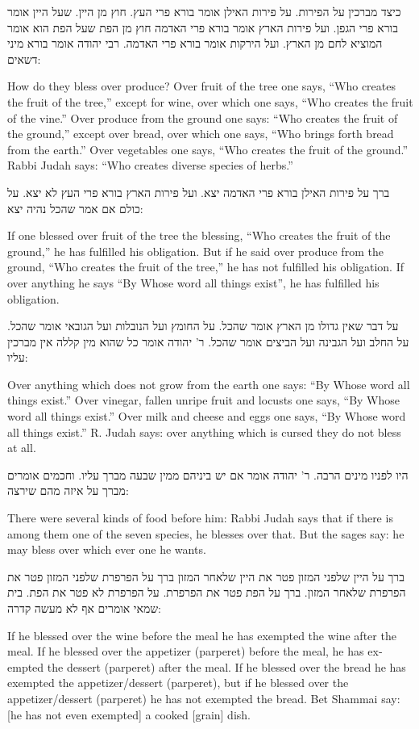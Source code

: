 \documentclass[12pt, openany]{book}
\newcommand{\textblock}[2]{
	{\fontsize{16pt}{20pt}\selectfont #1\\}
	
	\begin{english}
		#2
	\end{english}
	\clearpage
}
\begin{document}
\textblock{כיצד מברכין על הפירות. על פירות האילן אומר בורא פרי העץ. חוץ מן היין. שעל היין אומר בורא פרי הגפן. ועל פירות הארץ אומר בורא פרי האדמה חוץ מן הפת שעל הפת הוא אומר המוציא לחם מן הארץ. ועל הירקות אומר בורא פרי האדמה. רבי יהודה אומר בורא מיני דשאים: }{How do they bless over produce? Over fruit of the tree one says, “Who creates the fruit of the tree,” except for wine, over which one says, “Who creates the fruit of the vine.” Over produce from the ground one says: “Who creates the fruit of the ground,” except over bread, over which one says, “Who brings forth bread from the earth.” Over vegetables one says, “Who creates the fruit of the ground.” Rabbi Judah says: “Who creates diverse species of herbs.”}
\textblock{ברך על פירות האילן בורא פרי האדמה יצא. ועל פירות הארץ בורא פרי העץ לא יצא. על כולם אם אמר שהכל נהיה יצא: }{If one blessed over fruit of the tree the blessing, “Who creates the fruit of the ground,” he has fulfilled his obligation. But if he said over produce from the ground, “Who creates the fruit of the tree,” he has not fulfilled his obligation. If over anything he says “By Whose word all things exist”, he has fulfilled his obligation.}
\textblock{על דבר שאין גדולו מן הארץ אומר שהכל. על החומץ ועל הנובלות ועל הגובאי אומר שהכל. על החלב ועל הגבינה ועל הביצים אומר שהכל. ר' יהודה אומר כל שהוא מין קללה אין מברכין עליו: }{Over anything which does not grow from the earth one says: “By Whose word all things exist.” Over vinegar, fallen unripe fruit and locusts one says, “By Whose word all things exist.” Over milk and cheese and eggs one says, “By Whose word all things exist.”  R. Judah says: over anything which is cursed they do not bless at all.}
\textblock{היו לפניו מינים הרבה. ר' יהודה אומר אם יש ביניהם ממין שבעה מברך עליו. וחכמים אומרים מברך על איזה מהם שירצה: }{There were several kinds of food before him: Rabbi Judah says that if there is among them one of the seven species, he blesses over that. But the sages say: he may bless over which ever one he wants.}
\textblock{ברך על היין שלפני המזון פטר את היין שלאחר המזון ברך על הפרפרת שלפני המזון פטר את הפרפרת שלאחר המזון. ברך על הפת פטר את הפרפרת. על הפרפרת לא פטר את הפת. בית שמאי אומרים אף לא מעשה קדרה: }{If he blessed over the wine before the meal he has exempted the wine after the meal. If he blessed over the appetizer (parperet) before the meal, he has exempted the dessert (parperet) after the meal. If he blessed over the bread he has exempted the appetizer/dessert (parperet), but if he blessed over the appetizer/dessert (parperet) he has not exempted the bread. Bet Shammai say: {[he has not even exempted]} a cooked {[grain]} dish.}
\end{document}
